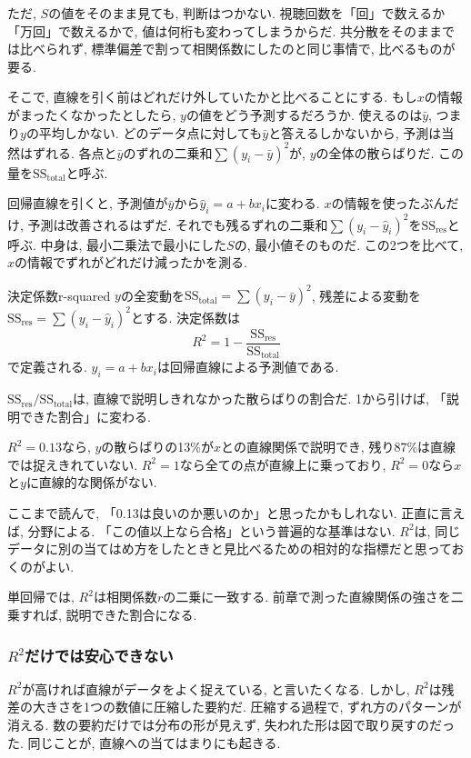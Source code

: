 ただ, $S$の値をそのまま見ても, 判断はつかない.
視聴回数を「回」で数えるか「万回」で数えるかで, 値は何桁も変わってしまうからだ.
共分散をそのままでは比べられず, 標準偏差で割って相関係数にしたのと同じ事情で, 比べるものが要る.

そこで, 直線を引く前はどれだけ外していたかと比べることにする.
もし$x$の情報がまったくなかったとしたら, $y$の値をどう予測するだろうか.
使えるのは$\bar{y}$, つまり$y$の平均しかない.
どのデータ点に対しても$\bar{y}$と答えるしかないから, 予測は当然はずれる.
各点と$\bar{y}$のずれの二乗和$\sum(y_i - \bar{y})^2$が, $y$の全体の散らばりだ.
この量を$\mathrm{SS_{total}}$と呼ぶ.

回帰直線を引くと, 予測値が$\bar{y}$から$\hat{y}_i = a + bx_i$に変わる.
$x$の情報を使ったぶんだけ, 予測は改善されるはずだ.
それでも残るずれの二乗和$\sum(y_i - \hat{y}_i)^2$を$\mathrm{SS_{res}}$と呼ぶ.
中身は, 最小二乗法で最小にした$S$の, 最小値そのものだ.
この2つを比べて, $x$の情報でずれがどれだけ減ったかを測る.

\begin{defi}{決定係数}{r-squared}
$y$の全変動を$\mathrm{SS_{total}} = \sum(y_i - \bar{y})^2$, 残差による変動を$\mathrm{SS_{res}} = \sum(y_i - \hat{y}_i)^2$とする.
決定係数は
\[
  R^2 = 1 - \frac{\mathrm{SS_{res}}}{\mathrm{SS_{total}}}
\]
で定義される. $\hat{y}_i = a + bx_i$は回帰直線による予測値である.
\end{defi}

$\mathrm{SS_{res}} / \mathrm{SS_{total}}$は, 直線で説明しきれなかった散らばりの割合だ.
1から引けば, 「説明できた割合」に変わる.

$R^2 = 0.13$なら, $y$の散らばりの13\%が$x$との直線関係で説明でき, 残り87\%は直線では捉えきれていない.
$R^2 = 1$なら全ての点が直線上に乗っており, $R^2 = 0$なら$x$と$y$に直線的な関係がない.

ここまで読んで, 「0.13は良いのか悪いのか」と思ったかもしれない.
正直に言えば, 分野による.
「この値以上なら合格」という普遍的な基準はない.
$R^2$は, 同じデータに別の当てはめ方をしたときと見比べるための相対的な指標だと思っておくのがよい.

単回帰では, $R^2$は相関係数$r$の二乗に一致する.
前章で測った直線関係の強さを二乗すれば, 説明できた割合になる.

\subsubsection*{\texorpdfstring{$R^2$}{R²}だけでは安心できない}

$R^2$が高ければ直線がデータをよく捉えている, と言いたくなる.
しかし, $R^2$は残差の大きさを1つの数値に圧縮した要約だ.
圧縮する過程で, ずれ方のパターンが消える.
数の要約だけでは分布の形が見えず, 失われた形は図で取り戻すのだった.
同じことが, 直線への当てはまりにも起きる.

